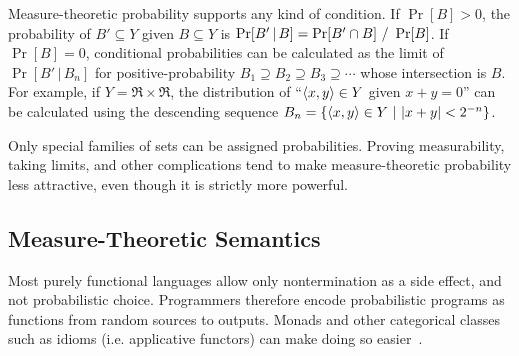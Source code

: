 \documentclass{llncs}
\begin{document}
Measure-theoretic probability supports any kind of condition.
If $\Pr[B] > \mathrm{0}$, the probability of $B' \subseteq Y$ given $B \subseteq Y$ is
$\Pr[B'\,|\,B] = \Pr[B' \i B]\ /\ \Pr[B]$.
If $\Pr[B] = \mathrm{0}$, conditional probabilities can be calculated as the limit of $\Pr[B'\,|\,B_n]$ for positive-probability $B_1 \supseteq B_2 \supseteq B_3 \supseteq \cdots$ whose intersection is $B$.
For example, if $Y = \Re \times \Re$, the distribution of ``$\langle{x,y}\rangle \in Y$ given $x + y = \mathrm{0}$'' can be calculated using the descending sequence $B_n = \lbrace {\langle{x,y}\rangle \in Y} \ \lvert\ {|x + y| < \mathrm{2}^{-n}} \rbrace$.

Only special families of  sets can be assigned probabilities.
Proving measurability, taking limits, and other complications tend to make measure-theoretic probability less attractive, even though it is strictly more powerful.

\subsection{Measure-Theoretic Semantics}

Most purely functional languages allow only nontermination as a side effect, and not probabilistic choice.
Programmers therefore encode probabilistic programs as functions from random sources to outputs.
Monads and other categorical classes such as idioms (i.e. applicative functors) can make doing so easier~\cite{cit:hurd-2002thesis,cit:toronto-2010ifl-bayes}.
\end{document}
